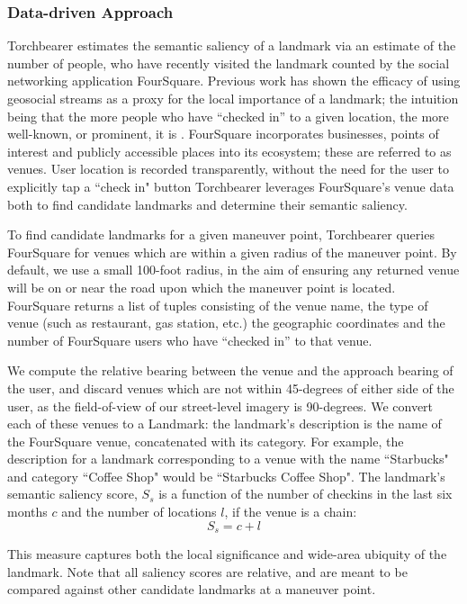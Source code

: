 \subsubsection{Data-driven Approach}
Torchbearer estimates the semantic saliency of a landmark via an estimate of the number of people, who have recently visited the landmark counted by the social networking application FourSquare. Previous work has shown the efficacy of using geosocial streams as a proxy for the local importance of a landmark; the intuition being that the more people who have “checked in” to a given location, the more well-known, or prominent, it is \cite{quesnot2014measure}. FourSquare incorporates businesses, points of interest and publicly accessible places into its ecosystem; these are referred to as venues. User location is recorded transparently, without the need for the user to explicitly tap a ``check in" button Torchbearer leverages FourSquare’s venue data both to find candidate landmarks and determine their semantic saliency. 

To find candidate landmarks for a given maneuver point, Torchbearer queries FourSquare for venues which are within a given radius of the maneuver point. By default, we use a small 100-foot radius, in the aim of ensuring any returned venue will be on or near the road upon which the maneuver point is located. FourSquare returns a list of tuples consisting of the venue name, the type of venue (such as restaurant, gas station, etc.) the geographic coordinates and the number of FourSquare users who have “checked in” to that venue. 

We compute the relative bearing between the venue and the approach bearing of the user, and discard venues which are not within 45-degrees of either side of the user, as the field-of-view of our street-level imagery is 90-degrees. We convert each of these venues to a Landmark: the landmark's description is the name of the FourSquare venue, concatenated with its category. For example, the description for a landmark corresponding to a venue with the name ``Starbucks" and category ``Coffee Shop" would be ``Starbucks Coffee Shop". The landmark’s semantic saliency score, $S_s$ is a function of the number of checkins in the last six months $c$ and the number of locations $l$, if the venue is a chain:
\begin{equation}
    S_s = c + l
\end{equation}

This measure captures both the local significance and wide-area ubiquity of the landmark. Note that all saliency scores are relative, and are meant to be compared against other candidate landmarks at a maneuver point.

